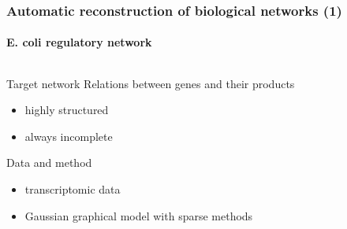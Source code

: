 \begin{frame}
  \frametitle{Automatic reconstruction of biological networks (1)} 
  \framesubtitle{E. coli regulatory network}  

  \begin{columns}
    \begin{column}{.4\textwidth}
      \begin{small}
        \begin{block}{Target network}
          Relations between genes and their products
          \begin{itemize}
          \item highly structured
          \item always incomplete
          \end{itemize}
        \end{block}
      \end{small}
      \begin{small}
        \begin{block}{Data and method}
          \begin{itemize}
          \item transcriptomic data
          \item Gaussian graphical model with sparse methods
          \end{itemize}
        \end{block}
      \end{small}
    \end{column}
    \begin{column}{.55\textwidth}

\end{column}
\end{columns}
\end{frame}
